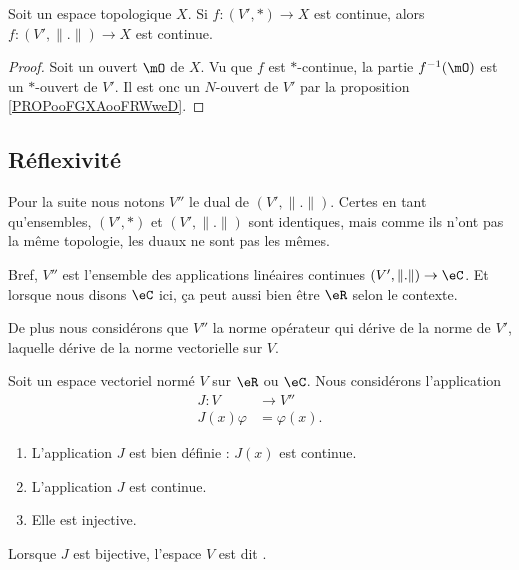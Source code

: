 \begin{corollary}
    Soit un espace topologique \( X\). Si \( f\colon (V',*)\to X\) est continue, alors \( f\colon (V',\| . \|)\to X\) est continue.
\end{corollary}

\begin{proof}
    Soit un ouvert \( \mO\) de \( X\). Vu que \( f\) est \( *\)-continue, la partie \( f^{-1}(\mO)\) est un \( *\)-ouvert de \( V'\). Il est onc un \( N\)-ouvert de \( V'\) par la proposition \ref{PROPooFGXAooFRWweD}.
\end{proof}

\subsection{Réflexivité}

Pour la suite nous notons \( V''\) le dual de \( (V',\| . \|)\). Certes en tant qu'ensembles, \( (V',*)\) et \( (V',\| . \|) \) sont identiques, mais comme ils n'ont pas la même topologie, les duaux ne sont pas les mêmes.

Bref, \( V''\) est l'ensemble des applications linéaires continues \( (V',\| . \|)\to \eC\). Et lorsque nous disons \( \eC\) ici, ça peut aussi bien être \( \eR\) selon le contexte.

De plus nous considérons que \( V''\) la norme opérateur qui dérive de la norme de \( V'\), laquelle dérive de la norme vectorielle sur \( V\).

\begin{propositionDef}      \label{PROPooMAQSooCGFBBM}
    Soit un espace vectoriel normé $V$ sur $\eR$ ou $\eC$. Nous considérons l'application 
    \begin{equation}
        \begin{aligned}
            J\colon V&\to V'' \\
            J(x)\varphi&= \varphi(x). 
        \end{aligned}
    \end{equation}
    \begin{enumerate}
        \item       \label{ITEMooNVVSooNFXgnE}
            L'application \( J\) est bien définie : \( J(x)\) est continue.
        \item       \label{ITEMooKURHooZZWpbu}
            L'application \( J\) est continue.
        \item       \label{ITEMooTFYVooKhMOjp}
             Elle est injective.
    \end{enumerate}

    Lorsque \( J\) est bijective, l'espace \( V\) est dit .
\end{propositionDef}

